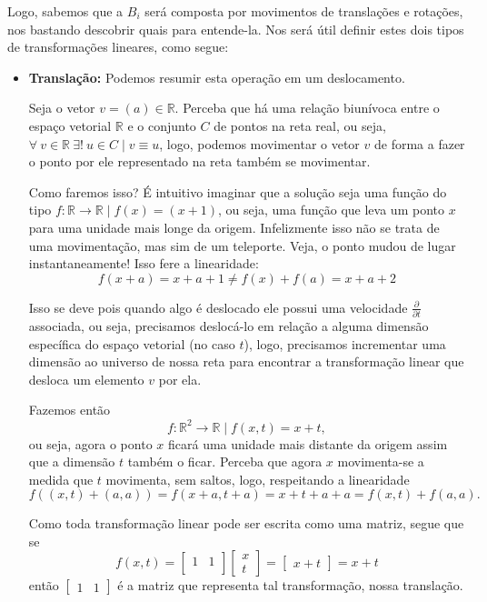 \documentclass[a4paper,12pt]{article}
\begin{document}
	 Logo, sabemos que a $B_i$ será composta por movimentos de translações e rotações, nos bastando descobrir quais para entende-la. Nos será útil definir estes dois tipos de transformações lineares, como segue:
	 \begin{itemize}
	 	\item \textbf{Translação:} Podemos resumir esta operação em um deslocamento.
	 	
	 	Seja o vetor $v = (a) \in \mathbb{R}$. Perceba que há uma relação biunívoca entre o espaço vetorial $\mathbb{R}$ e o conjunto $C$ de pontos na reta real, ou seja, $\forall \: v \in \mathbb{R} \:\exists! \: u \in C \mid v\equiv u$, logo, podemos movimentar o vetor $v$ de forma a fazer o ponto por ele representado na reta também se movimentar.
	 	
	 	Como faremos isso? É intuitivo imaginar que a solução seja uma função do tipo $f: \mathbb{R} \longrightarrow \mathbb{R} \mid f(x) = (x + 1)$, ou seja, uma função que leva um ponto $x$ para uma unidade mais longe da origem. Infelizmente isso não se trata de uma movimentação, mas sim de um teleporte. Veja, o ponto mudou de lugar instantaneamente! Isso fere a linearidade:
	 	$$f(x+a) = x+a+1 \neq f(x)+f(a) = x+a+2$$ 
	 	
	 	Isso se deve pois quando algo é deslocado ele possui uma velocidade $\frac{\partial}{\partial t}$ associada, ou seja, precisamos deslocá-lo em relação a alguma dimensão específica do espaço vetorial (no caso $t$), logo, precisamos incrementar uma dimensão ao universo de nossa reta para encontrar a transformação linear que desloca um elemento $v$ por ela.
	 	
	 	Fazemos então 
	 	$$f: \mathbb{R}^2 \longrightarrow \mathbb{R} \mid f(x,t) = x+t,$$
	 	ou seja, agora o ponto $x$ ficará uma unidade mais distante da origem assim que a dimensão $t$ também o ficar. Perceba que agora $x$ movimenta-se a medida que $t$ movimenta, sem saltos, logo, respeitando a linearidade
	 	$$f((x,t)+(a,a)) = f(x+a, t+a) = x+t+a+a = f(x,t)+f(a,a).$$
	 	
	 	Como toda transformação linear pode ser escrita como uma matriz, segue que se
	 	$$
	 	f(x,t) = 
	 	\begin{bmatrix}
	 	1 & 1\\
	 	\end{bmatrix}
	 	\begin{bmatrix}
	 	x\\
	 	t
	 	\end{bmatrix}
	 	=
	 	\begin{bmatrix}
	 	x+t
	 	\end{bmatrix}
	 	= x+t
	 	$$
	 	então $\begin{bmatrix} 1 & 1 \end{bmatrix}$ é a matriz que representa tal transformação, nossa translação.
	 	

\end{itemize}
\end{document}
